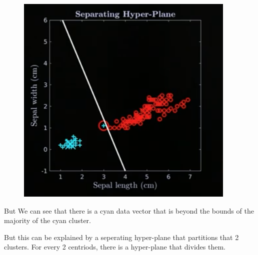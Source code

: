 \documentclass[12pt]{book}
\begin{document}
\begin{figure}[h]
        \includegraphics[scale=0.5]{./figures/iris3.png}
\end{figure}

But We can see that there is a cyan data vector that is beyond the bounds of
the majority of the cyan cluster.
\pagebreak

But this can be explained by a seperating hyper-plane that partitions that 2
clusters. For every 2 centriods, there is a hyper-plane that divides them.
\end{document}
